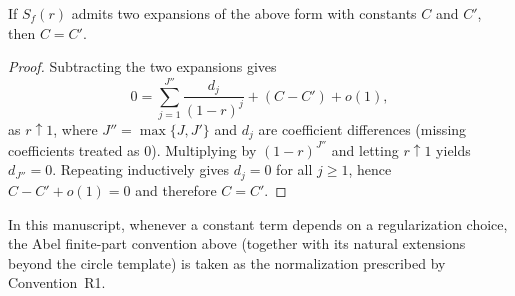 \begin{lemma}
If $S_f(r)$ admits two expansions of the above form with constants $C$ and $C'$, then $C=C'$.
\end{lemma}
\begin{proof}
Subtracting the two expansions gives
$$
0=\sum_{j=1}^{J''}\frac{d_j}{(1-r)^j}+(C-C')+o(1),
$$
as $r\uparrow 1$, where $J''=\max\{J,J'\}$ and $d_j$ are coefficient differences (missing coefficients treated as $0$). Multiplying by $(1-r)^{J''}$ and letting $r\uparrow 1$ yields $d_{J''}=0$. Repeating inductively gives $d_j=0$ for all $j\ge 1$, hence $C-C'+o(1)=0$ and therefore $C=C'$.
\end{proof}

\noindent
In this manuscript, whenever a constant term depends on a regularization choice, the Abel finite-part convention above (together with its natural extensions beyond the circle template) is taken as the normalization prescribed by Convention~R1.

